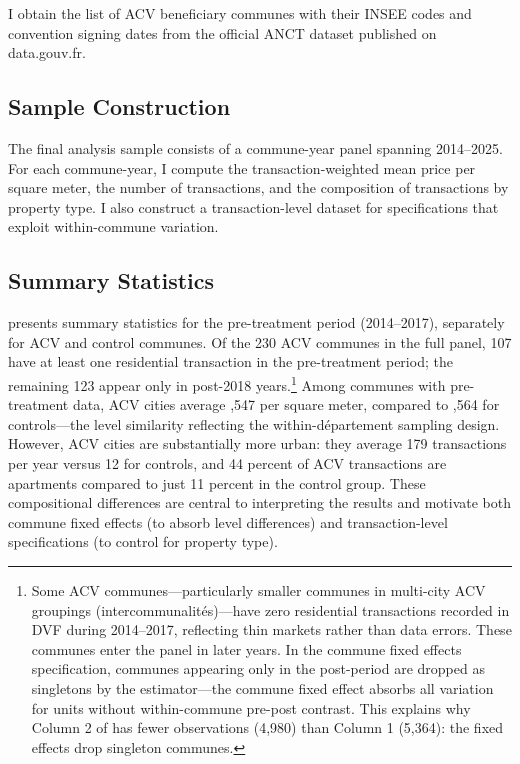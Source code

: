 \documentclass[12pt]{article}
\newcommand{\euro}{\texteuro}
\begin{document}
I obtain the list of ACV beneficiary communes with their INSEE codes and convention signing dates from the official ANCT dataset published on data.gouv.fr.

\subsection{Sample Construction}

The final analysis sample consists of a commune-year panel spanning 2014--2025. For each commune-year, I compute the transaction-weighted mean price per square meter, the number of transactions, and the composition of transactions by property type. I also construct a transaction-level dataset for specifications that exploit within-commune variation.

\subsection{Summary Statistics}

 presents summary statistics for the pre-treatment period (2014--2017), separately for ACV and control communes. Of the 230 ACV communes in the full panel, 107 have at least one residential transaction in the pre-treatment period; the remaining 123 appear only in post-2018 years.\footnote{Some ACV communes---particularly smaller communes in multi-city ACV groupings (intercommunalit\'{e}s)---have zero residential transactions recorded in DVF during 2014--2017, reflecting thin markets rather than data errors. These communes enter the panel in later years. In the commune fixed effects specification, communes appearing only in the post-period are dropped as singletons by the estimator---the commune fixed effect absorbs all variation for units without within-commune pre-post contrast. This explains why Column 2 of  has fewer observations (4,980) than Column 1 (5,364): the fixed effects drop singleton communes.} Among communes with pre-treatment data, ACV cities average \euro 1,547 per square meter, compared to \euro 1,564 for controls---the level similarity reflecting the within-d\'{e}partement sampling design. However, ACV cities are substantially more urban: they average 179 transactions per year versus 12 for controls, and 44 percent of ACV transactions are apartments compared to just 11 percent in the control group. These compositional differences are central to interpreting the results and motivate both commune fixed effects (to absorb level differences) and transaction-level specifications (to control for property type).
\end{document}
